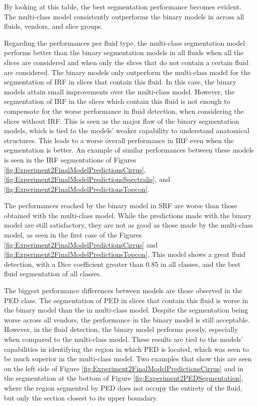 By looking at this table, the best segmentation performance becomes evident. The multi-class model consistently outperforms the binary models in across all fluids, vendors, and slice groups.
\par
Regarding the performances per fluid type, the multi-class segmentation model performs better than the binary segmentation models in all fluids when all the slices are considered and when only the slices that do not contain a certain fluid are considered. The binary models only outperform the multi-class model for the segmentation of IRF in slices that contain this fluid. In this case, the binary models attain small improvements over the multi-class model. However, the segmentation of IRF in the slices which contain this fluid is not enough to compensate for the worse performance in fluid detection, when considering the slices without IRF. This is seen as the major flaw of the binary segmentation models, which is tied to the models' weaker capability to understand anatomical structures. This leads to a worse overall performance in IRF even when the segmentation is better. An example of similar performances between these models is seen in the IRF segmentations of Figures \ref{fig:Experiment2FinalModelPredictionsCirrus}, \ref{fig:Experiment2FinalModelPredictionsSpectralis}, and \ref{fig:Experiment2FinalModelPredictionsTopcon}.
\par
The performances reached by the binary model in SRF are worse than those obtained with the multi-class model. While the predictions made with the binary model are still satisfactory, they are not as good as those made by the multi-class model, as seen in the first case of the Figures \ref{fig:Experiment2FinalModelPredictionsCirrus} and \ref{fig:Experiment2FinalModelPredictionsTopcon}. This model shows a great fluid detection, with a Dice coefficient greater than 0.85 in all classes, and the best fluid segmentation of all classes.
\par
The biggest performance differences between models are those observed in the PED class. The segmentation of PED in slices that contain this fluid is worse in the binary model than the in multi-class model. Despite the segmentation being worse across all vendors, the performance in the binary model is still acceptable. However, in the fluid detection, the binary model performs poorly, especially when compared to the multi-class model. These results are tied to the models' capabilities in identifying the region in which PED is located, which was seen to be much superior in the multi-class model. Two examples that show this are seen on the left side of Figure \ref{fig:Experiment2FinalModelPredictionsCirrus} and in the segmentation at the bottom of Figure \ref{fig:Experiment2PEDSegmentation}, where the region segmented by PED does not occupy the entirety of the fluid, but only the section closest to its upper boundary.
